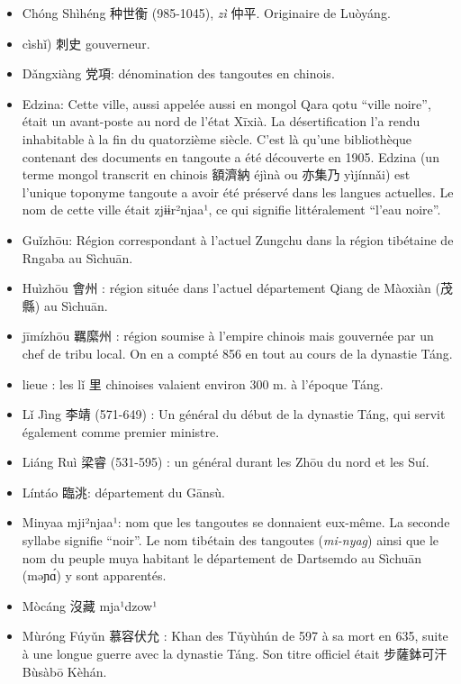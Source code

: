\documentclass[oldfontcommands,oneside,a4paper,11pt]{memoir}
\newcommand{\ipa}[1]{{\phon #1}} %
\newcommand{\ipapl}[1]{{\phondroit #1}}
\newcommand{\zh}[1]{{\cn #1}}
\newcommand{\ih}{\v{i}}
\newcommand{\uh}{\v{u}}
\begin{document}
\pagebreak
\begin{itemize}

\item Chóng Shìhéng \zh{种世衡} (985-1045), \textit{zì} \zh{仲平}. Originaire de Luòyáng. \label{pers:chongshiheng}
\item \ipa{cìshǐ}) \zh{刺史} gouverneur.
\item \ipapl{Dǎngxiàng} \zh{党項}: dénomination des tangoutes en chinois.
\item Edzina: Cette ville, aussi appelée aussi en mongol Qara qotu ``ville noire'', était un avant-poste au nord de l'état Xīxià. La désertification l'a rendu inhabitable à la fin du quatorzième siècle. C'est là qu'une bibliothèque contenant des documents en tangoute a été découverte en 1905. Edzina (un terme mongol transcrit en chinois \zh{額濟納} \ipa{éjìnà} ou \zh{亦集乃} \ipa{yìjínnǎi}) est l'unique toponyme tangoute a avoir été préservé dans les langues actuelles. Le nom de cette ville était  \ipa{zjɨɨr²njaa¹}, ce qui signifie littéralement ``l'eau noire''.
\item Gu\ih{}zhōu: Région correspondant à l'actuel Zungchu dans la région tibétaine de Rngaba au Sìchuān.
\item Huìzhōu \zh{會州} : région située dans l'actuel département Qiang de Màoxiàn (\zh{茂縣}) au Sìchuān.
\item jīmízhōu \zh{羈縻州} : région soumise à l'empire chinois mais gouvernée par un chef de tribu local. On en a compté 856 en tout au cours de la dynastie Táng.
\item lieue : les l\ih{} \zh{里} chinoises valaient environ 300 m. à l'époque Táng.
\item L\ih{} Jìng \zh{李靖} (571-649) : Un général du début de la dynastie Táng, qui servit également comme premier ministre.
\item Liáng Ruì \zh{梁睿} (531-595) : un général durant les Zhōu du nord et les Suí.
\item Líntáo \zh{臨洮}: département du Gānsù.
\item Minyaa  \ipa{mji²njaa¹}: nom que les tangoutes se donnaient eux-même. La seconde syllabe signifie ``noir''. Le nom tibétain des tangoutes (\textit{mi-nyag}) ainsi que le nom du peuple muya habitant le département de Dartsemdo au Sìchuān (\ipa{məɲɑ́}) y sont apparentés.
\item Mòcáng \zh{沒藏}  \ipa{mja¹dzow¹}
\item Mùróng Fúy\uh{}n \zh{慕容伏允} : Khan des T\uh{}yùhún de 597 à sa mort en 635, suite à une longue guerre avec la dynastie Táng. Son titre officiel était \zh{步薩鉢可汗} Bùsàbō Kèhán.

\end{itemize}
\end{document}
